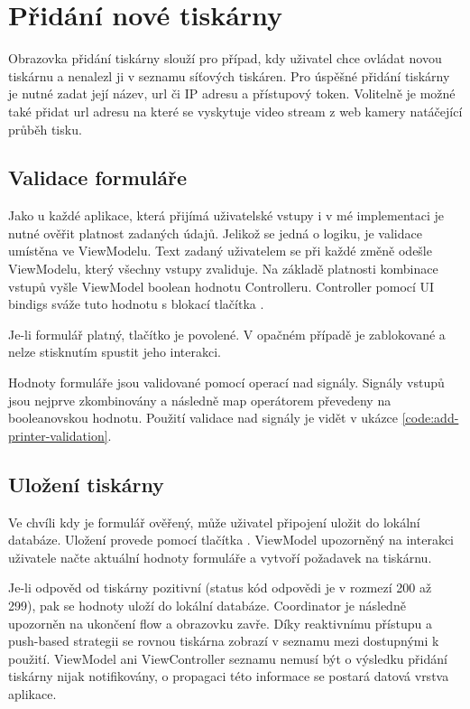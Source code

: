 \section{Přidání nové tiskárny}

Obrazovka přidání tiskárny slouží pro případ, kdy uživatel chce ovládat novou tiskárnu a nenalezl ji v seznamu síťových tiskáren.
Pro úspěšné přidání tiskárny je nutné zadat její název, \acrshort{url} či IP adresu a přístupový token.
Volitelně je možné také přidat url adresu na které se vyskytuje video stream z web kamery natáčející průběh tisku.

\subsection{Validace formuláře}

Jako u každé aplikace, která přijímá uživatelské vstupy i v mé implementaci je nutné ověřit platnost zadaných údajů.
Jelikož se jedná o logiku, je validace umístěna ve ViewModelu.
Text zadaný uživatelem se při každé změně odešle ViewModelu, který všechny vstupy zvaliduje.
Na základě platnosti kombinace vstupů vyšle ViewModel boolean hodnotu Controlleru.
Controller pomocí UI bindigs sváže tuto hodnotu s blokací tlačítka . 

Je-li formulář platný, tlačítko je povolené.
V opačném případě je zablokované a nelze stisknutím spustit jeho interakci.

Hodnoty formuláře jsou validované pomocí operací nad signály.
Signály vstupů jsou nejprve zkombinovány a následně map operátorem převedeny na booleanovskou hodnotu.
Použití validace nad signály je vidět v ukázce \ref{code:add-printer-validation}.


\subsection{Uložení tiskárny}

Ve chvíli kdy je formulář ověřený, může uživatel připojení uložit do lokální databáze.
Uložení provede pomocí tlačítka .
ViewModel upozorněný na interakci uživatele načte aktuální hodnoty formuláře a vytvoří požadavek na tiskárnu.

Je-li odpověd od tiskárny pozitivní (status kód odpovědi je v rozmezí 200 až 299), pak se hodnoty uloží do lokální databáze.
Coordinator je následně upozorněn na ukončení flow a obrazovku zavře.
Díky reaktivnímu přístupu a push-based strategii se rovnou tiskárna zobrazí v seznamu mezi dostupnými k použití.
ViewModel ani ViewController seznamu nemusí být o výsledku přidání tiskárny nijak notifikovány, o propagaci této informace se postará datová vrstva aplikace.

